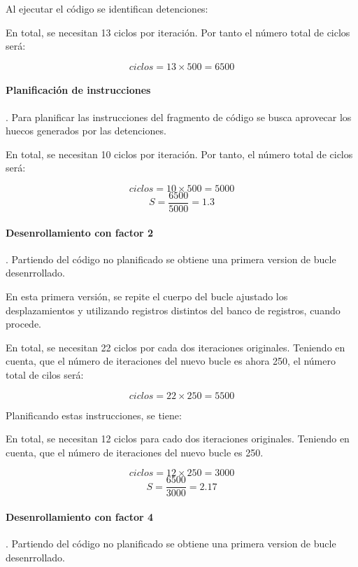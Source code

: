 Al ejecutar el código se identifican detenciones:



En total, se necesitan 13 ciclos por iteración.
Por tanto el número total de ciclos será:

\[
ciclos = 13 \times 500 = 6500
\]

\paragraph{Planificación de instrucciones}.
Para planificar las instrucciones del fragmento de código se busca aprovecar los
huecos generados por las detenciones.



En total, se necesitan 10 ciclos por iteración.
Por tanto, el número total de ciclos será:

\[
ciclos = 10 \times 500 = 5000
\]
\[
S = \frac{6500}{5000} = 1.3
\]

\paragraph{Desenrollamiento con factor 2}.
Partiendo del código no planificado se obtiene una primera
version de bucle desenrrollado.



En esta primera versión, se repite el cuerpo del bucle ajustado los
desplazamientos y utilizando registros distintos del banco de registros,
cuando procede.

En total, se necesitan 22 ciclos por cada dos iteraciones originales.
Teniendo en cuenta, que el número de iteraciones del nuevo bucle es ahora 250,
el número total de cilos será:

\[
ciclos = 22 \times 250 = 5500
\]

Planificando estas instrucciones, se tiene:



En total, se necesitan 12 ciclos para cado dos iteraciones originales.
Teniendo en cuenta, que el número de iteraciones del nuevo bucle es 250.

\[
ciclos = 12 \times 250 = 3000
\]
\[
S = \frac{6500}{3000} = 2.17
\]

\paragraph{Desenrollamiento con factor 4}.
Partiendo del código no planificado se obtiene una primera
version de bucle desenrrollado.

